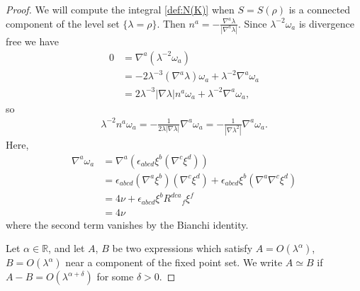 \documentclass[a4paper,10pt,reqno]{amsart}
\newcommand{\Reals}{\mathbb{R}}
\theoremstyle{plain}
\numberwithin{equation}{section}
\begin{document}
\begin{proof}
We will compute the integral \eqref{def:N(K)} when $S = S(\rho)$ is a connected component of the level set $\{\lambda=\rho\}$. Then $n^a = - \frac{\nabla^a \lambda}{|\nabla^a \lambda|}$. Since $\lambda^{-2} \omega_a$ is divergence free we have
\begin{align}
0 &= \nabla^a (\lambda^{-2} \omega_a)  \nonumber \\
&= -2 \lambda^{-3} (\nabla^a \lambda) \omega_a + \lambda^{-2} \nabla^a \omega_a \nonumber \\
&= 2 \lambda^{-3} |\nabla \lambda|  n^a \omega_a + \lambda^{-2} \nabla^a \omega_a,  
\end{align}
so
\begin{align}
\lambda^{-2} n^a \omega_a 
= - \frac{1}{2\lambda|\nabla\lambda| } \nabla^a \omega_a
= - \frac{1}{|\nabla\lambda^2| } \nabla^a \omega_a.
\end{align}
Here,   
\begin{align}
\nabla^a \omega_a
&= \nabla^a(\epsilon_{abcd} \xi^b (\nabla^c \xi^d) ) \nonumber \\ 
&= 
\epsilon_{abcd} (\nabla^a\xi^b) (\nabla^c \xi^d)
+ \epsilon_{abcd} \xi^b (\nabla^a \nabla^c \xi^d) \nonumber \\
&= 
4\nu
+ \epsilon_{abcd} \xi^b R^{dca}{}_f \xi^f \nonumber \\
&= 4\nu
\end{align}
where the second term vanishes by the Bianchi identity.

Let $\alpha \in \Reals$, and let $A$, $B$ be two expressions which satisfy $A = O(\lambda^{\alpha})$, $B = O(\lambda^{\alpha})$ near a component of the fixed point set. We write $A \simeq B$ if $A - B = O(\lambda^{\alpha + \delta})$ for some $\delta > 0$. 


\end{proof}
\end{document}
